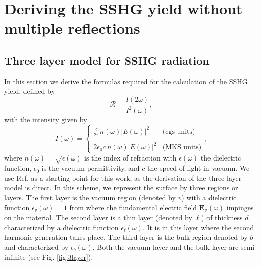 \chapter{Deriving the SSHG yield without multiple reflections}
\label{app:shgyieldnomr}

\section{Three layer model for SSHG radiation}\label{sec:threelayer}

In this section we derive the formulas required for the calculation of the SSHG
yield, defined by
\begin{equation}\label{uno}
\mathcal{R}=\frac{I(2\omega)}{I^{2}(\omega)},
\end{equation}
with the intensity given by\cite{boyd}
\begin{equation}\label{dos}
I(\omega)=
\left\{
\begin{array}{cc}
\frac{c}{2\pi}n(\omega) |E(\omega)|^{2}
& \text{(cgs units)} \\\\
2\epsilon_{0}c\, n(\omega)|E(\omega)|^{2}
& \text{(MKS units)}
\end{array}
\right.,
\end{equation}
where $n(\omega)=\sqrt{\epsilon(\omega)}$ is the index of refraction with
$\epsilon(\omega)$ the dielectric function, $\epsilon_{0}$ is the vacuum
permittivity, and $c$ the speed of light in vacuum. We use Ref.
\cite{mizrahiJOSA88} as a starting point for this work, as the derivation
of the three layer model is direct. In this scheme, we represent the surface by
three regions or layers. The first layer is the vacuum region (denoted by $v$)
with a dielectric function $\epsilon_{v}(\omega) = 1$ from where the fundamental
electric field $\mathbf{E}_{v}(\omega)$ impinges on the material. The second
layer is a thin layer (denoted by $\ell$) of thickness $d$ characterized by a
dielectric function $\epsilon_{\ell}(\omega)$. It is in this layer where the
second harmonic generation takes place. The third layer is the bulk region
denoted by $b$ and characterized by $\epsilon_{b}(\omega)$. Both the vacuum
layer and the bulk layer are semi-infinite (see Fig. \ref{fig:3layer}).

